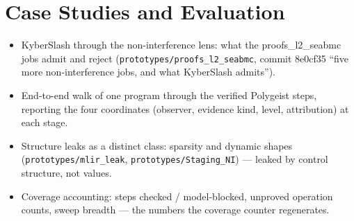 \section{Case Studies and Evaluation}


\begin{itemize}
  \item KyberSlash through the non-interference lens: what the
    proofs\_l2\_seabmc jobs admit and reject
    (\texttt{prototypes/proofs\_l2\_seabmc}, commit 8e0cf35
    ``five more non-interference jobs, and what KyberSlash admits'').
  \item End-to-end walk of one program through the verified Polygeist steps,
    reporting the four coordinates (observer, evidence kind, level,
    attribution) at each stage.
  \item Structure leaks as a distinct class: sparsity and dynamic shapes
    (\texttt{prototypes/mlir\_leak}, \texttt{prototypes/Staging\_NI}) ---
    leaked by control structure, not values.
  \item Coverage accounting: steps checked / model-blocked, unproved operation
    counts, sweep breadth --- the numbers the coverage counter regenerates.
\end{itemize}
